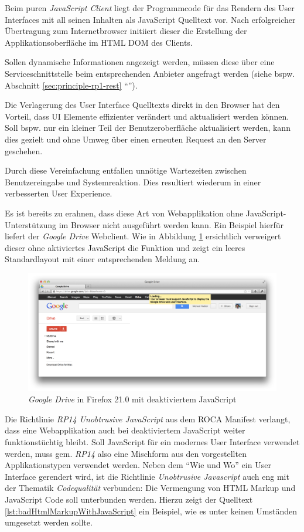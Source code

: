 Beim puren \emph{JavaScript Client} liegt der Programmcode für das Rendern des User Interfaces mit all seinen Inhalten als JavaScript Quelltext vor. Nach erfolgreicher Übertragung zum Internetbrowser initiiert dieser die Erstellung der Applikationsoberfläche im HTML \gls{DOM} des Clients.

Sollen dynamische Informationen angezeigt werden, müssen diese über eine Serviceschnittstelle beim entsprechenden Anbieter angefragt werden (siehe bspw. Abschnitt \ref{sec:principle-rp1-rest} ``'').

Die Verlagerung des User Interface Quelltexts direkt in den Browser hat den Vorteil, dass UI Elemente effizienter verändert und aktualisiert werden können. Soll bspw. nur ein kleiner Teil der Benutzeroberfläche aktualisiert werden, kann dies gezielt und ohne Umweg über einen erneuten Request an den Server geschehen.

Durch diese Vereinfachung entfallen unnötige Wartezeiten zwischen Benutzereingabe und Systemreaktion. Dies resultiert wiederum in einer verbesserten User Experience.

Es ist bereits zu erahnen, dass diese Art von Webapplikation ohne JavaScript-Unterstützung im Browser nicht ausgeführt werden kann. Ein Beispiel hierfür liefert der \emph{Google Drive} \cite{GoogleDrive} Webclient. Wie in Abbildung \ref{fig:googleDriveNoJs} ersichtlich verweigert dieser ohne aktiviertes JavaScript die Funktion und zeigt ein leeres Standardlayout mit einer entsprechenden Meldung an.

\begin{figure}[H]
	\centering
	\includegraphics[width=12cm]{content/principle-demonstration/images/googledrive-nojs.png}
	\caption{\emph{Google Drive} in Firefox 21.0 mit deaktiviertem JavaScript}
	\label{fig:googleDriveNoJs}
\end{figure}

Die Richtlinie \emph{RP14 Unobtrusive JavaScript} aus dem ROCA Manifest verlangt, dass eine Webapplikation auch bei deaktiviertem JavaScript weiter funktionstüchtig bleibt. Soll JavaScript für ein modernes User Interface verwendet werden, muss gem. \emph{RP14} also eine Mischform aus den vorgestellten Applikationstypen verwendet werden.
\newline\newline
Neben dem ``Wie und Wo'' ein User Interface gerendert wird, ist die Richtlinie \emph{Unobtrusive Javascript} auch eng mit der Thematik \emph{Codequalität} verbunden: Die Vermengung von HTML Markup und JavaScript Code soll unterbunden werden. Hierzu zeigt der Quelltext \ref{lst:badHtmlMarkupWithJavaScript} ein Beispiel, wie es unter keinen Umständen umgesetzt werden sollte.

